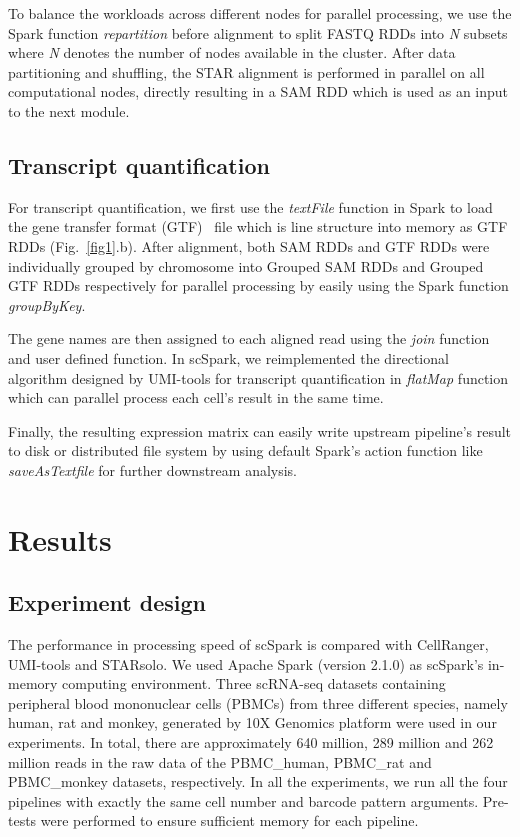 \documentclass[conference]{IEEEtran}
\begin{document}
To balance the workloads across different nodes for parallel processing, we use the Spark function \textit{repartition} before alignment to split FASTQ RDDs into \textit{N} subsets where \textit{N} denotes the number of nodes available in the cluster.
After data partitioning and shuffling, the STAR alignment is performed in parallel on all computational nodes, directly resulting in a SAM RDD which is used as an input to the next module.

\subsection{Transcript quantification}
For transcript quantification, we first use the \textit{textFile} function in Spark to load the gene transfer format (GTF)~\cite{breese2013ngsutils} file which is line structure into memory as GTF RDDs (Fig.~\ref{fig1}.b). 
After alignment, both SAM RDDs and GTF RDDs were individually grouped by chromosome into Grouped SAM RDDs and Grouped GTF RDDs respectively for parallel processing by easily using the Spark function \textit{groupByKey}. 

The gene names are then assigned to each aligned read using the \textit{join} function and user defined function. 
In scSpark, we reimplemented the directional algorithm designed by UMI-tools for transcript quantification in \textit{flatMap} function which can parallel process each cell's result in the same time. 

Finally, the resulting expression matrix can easily write upstream pipeline's result to disk or distributed file system by using default Spark's action function like \textit{saveAsTextfile} for further downstream analysis. 

\section{Results}

\subsection{Experiment design}
The performance in processing speed of scSpark is compared with CellRanger, UMI-tools and STARsolo. 
We used Apache Spark (version 2.1.0) as scSpark's in-memory computing environment. 
Three scRNA-seq datasets containing peripheral blood mononuclear cells (PBMCs) from three different species, namely human, rat and monkey, generated by 10X Genomics platform were used in our experiments. 
In total, there are approximately 640 million, 289 million and 262 million reads in the raw data of the PBMC\_human, PBMC\_rat and PBMC\_monkey datasets, respectively. 
In all the experiments, we run all the four pipelines with exactly the same cell number and barcode pattern arguments.
Pre-tests were performed to ensure sufficient memory for each pipeline.
\end{document}
